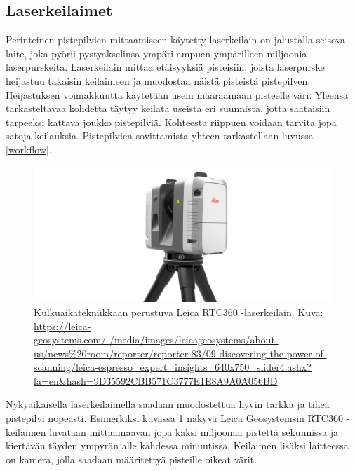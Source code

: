 \subsection{Laserkeilaimet}\label{laserkeilaimet}

Perinteinen pistepilvien mittaamiseen käytetty laserkeilain on jalustalla seisova laite, joka pyörii pystyakselinsa ympäri ampuen ympärilleen miljoonia laserpurskeita. Laserkeilain mittaa etäisyyksiä pisteisiin, joista laserpurske heijastuu takaisin keilaimeen ja muodostaa näistä pisteistä pistepilven. Heijastuksen voimakkuutta käytetään usein määräämään pisteelle väri. Yleensä tarkasteltavaa kohdetta täytyy keilata useista eri suunnista, jotta saataisiin tarpeeksi kattava joukko pistepilviä. Kohteesta riippuen voidaan tarvita jopa satoja keilauksia. Pistepilvien sovittamista yhteen tarkastellaan luvussa \ref{workflow}.

\begin{figure}
    \centering
    \includegraphics[width=0.7\paperwidth]{img/leica.jpg}
    \caption{Kulkuaikatekniikkaan perustuva Leica RTC360 -laserkeilain. Kuva: \url{https://leica-geosystems.com/-/media/images/leicageosystems/about-us/news\%20room/reporter/reporter-83/09-discovering-the-power-of-scanning/leica-espresso_expert_insights_640x750_slider4.ashx?la=en&hash=9D35592CBB571C3777E1E8A9A0A056BD}}
    \label{leica}
\end{figure}

Nykyaikaisella laserkeilaimella saadaan muodostettua hyvin tarkka ja tiheä pistepilvi nopeasti. Esimerkiksi kuvassa \ref{leica} näkyvä Leica Geosystemsin RTC360 -keilaimen luvataan mittaamaavan jopa kaksi miljoonaa pistettä sekunnissa ja kiertävän täyden ympyrän alle kahdessa minuutissa. Keilaimen lisäksi laitteessa on kamera, jolla saadaan määritettyä pisteille oikeat värit. \cite{leica} 

